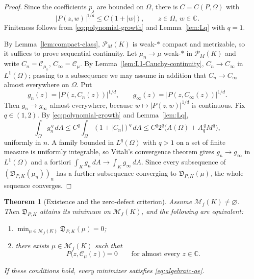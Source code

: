 \documentclass[reqno]{amsart}
\newtheorem{theorem}{Theorem}[section]
\theoremstyle{definition}
\theoremstyle{remark}
\newcommand{\bC}{\mathbb C}
\newcommand{\M}{\mathcal M}
\newcommand{\Cauchy}{\mathcal C}
\begin{document}
\begin{proof}
Since the coefficients $p_j$ are bounded on $\Omega$, there is $C=C(P,\Omega)$
with
\begin{equation}\label{eq:polynomial-growth}
 |P(z,w)|^{1/d}\leq C(1+|w|),
 \qquad z\in\Omega,\ w\in\bC .
\end{equation}
Finiteness follows from \eqref{eq:polynomial-growth} and
Lemma~\ref{lem:Lq} with $q=1$.

By Lemma~\ref{lem:compact-class}, $\mathcal P_M(K)$ is weak-$*$ compact and
metrizable, so it suffices to prove sequential continuity.  Let
$\mu_n\to\mu$ weak-$*$ in $\mathcal P_M(K)$ and write $C_n=\Cauchy_{\mu_n}$,
$C_\infty=\Cauchy_\mu$.  By Lemma~\ref{lem:L1-Cauchy-continuity},
$C_n\to C_\infty$ in $L^1(\Omega)$; passing to a subsequence we may assume in
addition that $C_n\to C_\infty$ almost everywhere on $\Omega$.  Put
\[
 g_n(z)=\bigl|P(z,C_n(z))\bigr|^{1/d},
 \qquad
 g_\infty(z)=\bigl|P(z,C_\infty(z))\bigr|^{1/d} .
\]
Then $g_n\to g_\infty$ almost everywhere, because $w\mapsto|P(z,w)|^{1/d}$ is
continuous.  Fix $q\in(1,2)$.  By \eqref{eq:polynomial-growth} and
Lemma~\ref{lem:Lq},
\[
 \int_\Omega g_n^{\,q}\,dA
 \leq C^q\int_\Omega(1+|C_n|)^{q}\,dA
 \leq C^q2^{q}\bigl(A(\Omega)+A_q^{\,q}M^{q}\bigr),
\]
uniformly in $n$.  A family bounded in $L^q(\Omega)$ with $q>1$ on a set of
finite measure is uniformly integrable, so Vitali's convergence theorem gives
$g_n\to g_\infty$ in $L^1(\Omega)$ and a fortiori
$\int_Kg_n\,dA\to\int_Kg_\infty\,dA$.  Since every subsequence of
$(\mathfrak D_{P,K}(\mu_n))_n$ has a further subsequence converging to
$\mathfrak D_{P,K}(\mu)$, the whole sequence converges.
\end{proof}

\begin{theorem}[Existence and the zero-defect criterion]
\label{thm:main-defect}
Assume $\M_f(K)\neq\varnothing$.  Then $\mathfrak D_{P,K}$ attains its minimum
on $\M_f(K)$, and the following are equivalent:
\begin{enumerate}[label=\textup{(\roman*)}]
\item $\min_{\mu\in\M_f(K)}\mathfrak D_{P,K}(\mu)=0$;
\item there exists $\mu\in\M_f(K)$ such that
\begin{equation}\label{eq:algebraic-ae}
 P\bigl(z,\Cauchy_\mu(z)\bigr)=0
 \qquad\text{for almost every }z\in\bC .
\end{equation}
\end{enumerate}
If these conditions hold, every minimizer satisfies \eqref{eq:algebraic-ae}.
\end{theorem}
\end{document}
